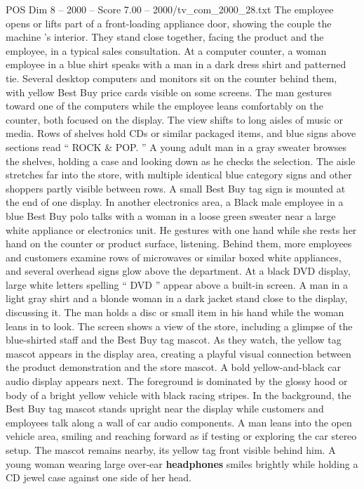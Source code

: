 \begin{textsample}{POS Dim 8 – 2000 – Score 7.00 – 2000/tv\_com\_2000\_28.txt}
The employee opens or lifts part of a front-loading appliance door, showing the couple the machine ’s interior.
They stand close together, facing the product and the employee, in a typical sales consultation.
At a computer counter, a woman employee in a blue shirt speaks with a man in a dark dress shirt and patterned tie.
Several desktop computers and monitors sit on the counter behind them, with yellow Best Buy price cards visible on some screens.
The man gestures toward one of the computers while the employee leans comfortably on the counter, both focused on the display.
The view shifts to long aisles of music or media.
Rows of shelves hold CDs or similar packaged items, and blue signs above sections read “ ROCK \& POP. ” A young adult man in a gray sweater browses the shelves, holding a case and looking down as he checks the selection.
The aisle stretches far into the store, with multiple identical blue category signs and other shoppers partly visible between rows.
A small Best Buy tag sign is mounted at the end of one display.
In another electronics area, a Black male employee in a blue Best Buy polo talks with a woman in a loose green sweater near a large white appliance or electronics unit.
He gestures with one hand while she rests her hand on the counter or product surface, listening.
Behind them, more employees and customers examine rows of microwaves or similar boxed white appliances, and several overhead signs glow above the department.
At a black DVD display, large white letters spelling “ DVD ” appear above a built-in screen.
A man in a light gray shirt and a blonde woman in a dark jacket stand close to the display, discussing it.
The man holds a disc or small item in his hand while the woman leans in to look.
The screen shows a view of the store, including a glimpse of the blue-shirted staff and the Best Buy tag mascot.
As they watch, the yellow tag mascot appears in the display area, creating a playful visual connection between the product demonstration and the store mascot.
A bold yellow-and-black car audio display appears next.
The foreground is dominated by the glossy hood or body of a bright yellow vehicle with black racing stripes.
In the background, the Best Buy tag mascot stands upright near the display while customers and employees talk along a wall of car audio components.
A man leans into the open vehicle area, smiling and reaching forward as if testing or exploring the car stereo setup.
The mascot remains nearby, its yellow tag front visible behind him.
A young woman wearing large over-ear \textbf{headphones} smiles brightly while holding a CD jewel case against one side of her head.

\end{textsample}
